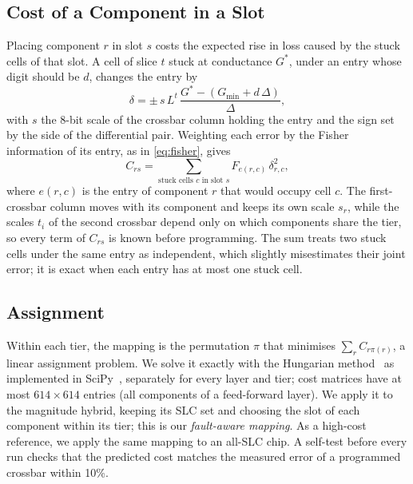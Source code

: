 \subsection{Cost of a Component in a Slot}
Placing component $r$ in slot $s$ costs the expected rise in loss caused by the stuck cells of that slot.
A cell of slice $t$ stuck at conductance $G^{*}$, under an entry whose digit should be $d$, changes the
entry by
\begin{equation}
\delta=\pm\,s\,L^{t}\,\frac{G^{*}-(G_{\min}+d\,\Delta)}{\Delta},
\label{eq:stuckerr}
\end{equation}
with $s$ the 8-bit scale of the crossbar column holding the entry and the sign set by the side of the
differential pair. Weighting each error by the Fisher information of its entry, as in \cref{eq:fisher},
gives
\begin{equation}
C_{rs}=\sum_{\text{stuck cells }c\text{ in slot }s}F_{e(r,c)}\,\delta_{r,c}^{2},
\label{eq:cost}
\end{equation}
where $e(r,c)$ is the entry of component $r$ that would occupy cell $c$. The first-crossbar column moves with
its component and keeps its own scale $s_r$, while the scales $t_i$ of the second crossbar depend only on
which components share the tier, so every term of $C_{rs}$ is known before programming. The sum treats two
stuck cells under the same entry as independent, which slightly misestimates their joint error; it is
exact when each entry has at most one stuck cell.

\subsection{Assignment}
Within each tier, the mapping is the permutation $\pi$ that minimises $\sum_r C_{r\pi(r)}$, a linear
assignment problem. We solve it exactly with the Hungarian method~\cite{kuhn1955hungarian} as implemented
in SciPy~\cite{virtanen2020scipy}, separately for every layer and tier; cost matrices have at most
$614\times614$ entries (all components of a feed-forward layer). We apply it to the
magnitude hybrid, keeping its SLC set and choosing the slot of each component within its tier; this is
our \emph{fault-aware mapping}. As a high-cost reference, we apply the same mapping to an all-SLC chip. A self-test before every run
checks that the predicted cost matches the measured error of a programmed crossbar within 10\%.

